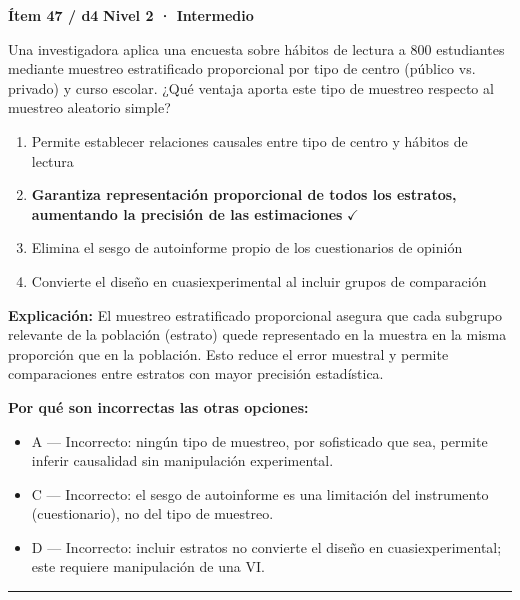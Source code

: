 \documentclass[12pt,a4paper]{article}
\begin{document}
\begin{mdframed}[backgroundcolor=fondogris,linecolor=ambar,linewidth=1pt,innerleftmargin=10pt,innerrightmargin=10pt,innertopmargin=7pt,innerbottommargin=7pt]
\textbf{Ítem 47 / d4} \hfill {\small\bfseries\color{ambar} Nivel 2 · Intermedio}
\end{mdframed}

Una investigadora aplica una encuesta sobre hábitos de lectura a 800 estudiantes mediante muestreo estratificado proporcional por tipo de centro (público vs. privado) y curso escolar. ¿Qué ventaja aporta este tipo de muestreo respecto al muestreo aleatorio simple?

\begin{enumerate}
  \item[A.] Permite establecer relaciones causales entre tipo de centro y hábitos de lectura
  \item[\textbf{\color{verde}B.}] \textbf{\color{verde} Garantiza representación proporcional de todos los estratos, aumentando la precisión de las estimaciones} \hfill $\checkmark$
  \item[C.] Elimina el sesgo de autoinforme propio de los cuestionarios de opinión
  \item[D.] Convierte el diseño en cuasiexperimental al incluir grupos de comparación
\end{enumerate}

\noindent\textbf{\color{azul}Explicación:} El muestreo estratificado proporcional asegura que cada subgrupo relevante de la población (estrato) quede representado en la muestra en la misma proporción que en la población. Esto reduce el error muestral y permite comparaciones entre estratos con mayor precisión estadística.

\noindent\textbf{\color{gris}Por qué son incorrectas las otras opciones:}
\begin{itemize}
  \item {\small A — Incorrecto: ningún tipo de muestreo, por sofisticado que sea, permite inferir causalidad sin manipulación experimental.}
  \item {\small C — Incorrecto: el sesgo de autoinforme es una limitación del instrumento (cuestionario), no del tipo de muestreo.}
  \item {\small D — Incorrecto: incluir estratos no convierte el diseño en cuasiexperimental; este requiere manipulación de una VI.}
\end{itemize}
\vspace{8pt}\hrule\vspace{10pt}
\end{document}
